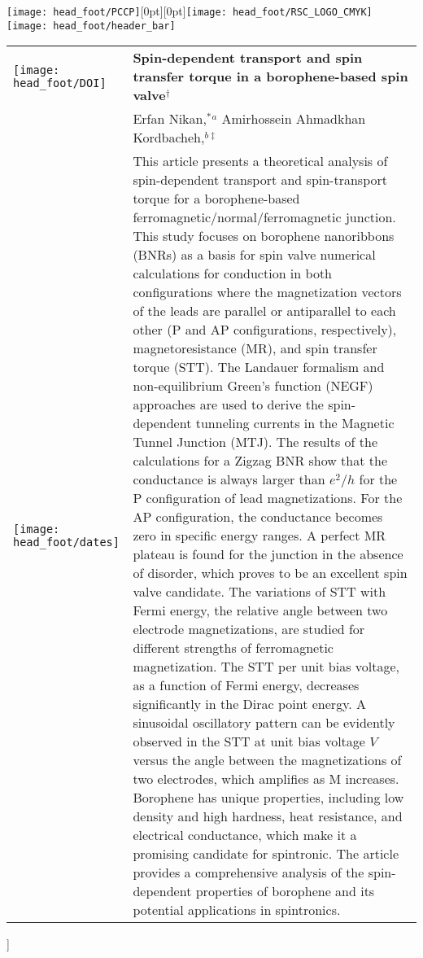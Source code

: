 \documentclass[twoside,twocolumn,9pt]{article}
\begin{document}
  \begin{@twocolumnfalse}
{\texttt{[image: head\_foot/PCCP]}\hfill\raisebox{0pt}[0pt][0pt]{\texttt{[image: head\_foot/RSC\_LOGO\_CMYK]}}\\[1ex]
\texttt{[image: head\_foot/header\_bar]}}\par
\vspace{1em}
\sffamily
\begin{tabular}{m{4.5cm} p{13.5cm}}

\texttt{[image: head\_foot/DOI]} & \noindent\LARGE{\textbf{Spin-dependent transport and spin transfer torque in a borophene-based spin valve$^\dag$}} \\%
&\noindent\large{Erfan Nikan,$^{\ast}$\textit{$^{a}$} Amirhossein Ahmadkhan Kordbacheh,\textit{$^{b\ddag}$}} \\%

\texttt{[image: head\_foot/dates]} & \noindent\normalsize{This article presents a theoretical analysis of spin-dependent transport and spin-transport torque for a borophene-based ferromagnetic/normal/ferromagnetic junction. This study focuses on borophene nanoribbons (BNRs) as a basis for spin valve numerical calculations for conduction in both configurations where the magnetization vectors of the leads are parallel or antiparallel to each other (P and AP configurations, respectively), magnetoresistance (MR), and spin transfer torque (STT). The Landauer formalism and non-equilibrium Green's function (NEGF) approaches are used to derive the spin-dependent tunneling currents in the Magnetic Tunnel Junction (MTJ). The results of the calculations for a Zigzag BNR show that the conductance is always larger than $e^2/h$ for the P configuration of lead magnetizations. For the AP configuration, the conductance becomes zero in specific energy ranges. A perfect MR plateau is found for the junction in the absence of disorder, which proves to be an excellent spin valve candidate. The variations of STT with Fermi energy, the relative angle between two electrode magnetizations, are studied for different strengths of ferromagnetic magnetization. The STT per unit bias voltage, as a function of Fermi energy, decreases significantly in the Dirac point energy. A sinusoidal oscillatory pattern can be evidently observed in the STT at unit bias voltage $V$ versus the angle between the magnetizations of two electrodes, which amplifies as M increases. Borophene has unique properties, including low density and high hardness, heat resistance, and electrical conductance, which make it a promising candidate for spintronic. The article provides a comprehensive analysis of the spin-dependent properties of borophene and its potential applications in spintronics.} \\%

\end{tabular}
\end{@twocolumnfalse} \vspace{0.6cm}
]
\renewcommand*\rmdefault{bch}\normalfont\upshape
\rmfamily
\end{document}
